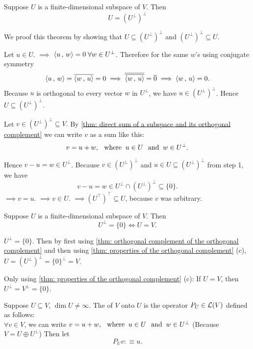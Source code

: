 \begin{thm}
  \label{thm: orthogonal complement of the orthogonal complement}
  Suppose $U$ is a finite-dimensional subspace of $V$. Then
  \[
    U = (U^{\bot})^{\bot}
  \]
\end{thm}
\begin{prf}
  We proof this theorem by showing that $U \subseteq (U^{\bot})^{\bot}$ and $ (U^{\bot})^{\bot} \subseteq U$.

   Let $u \in U$. $\implies$ $\left \langle u \, , \, w \right \rangle=0 \; \forall w \in U^{\bot}$.
  Therefore for the same $w$'s using conjugate symmetry
  \[
    \left \langle u \, , \, w \right \rangle=\overline{\left \langle w \, , \, u \right \rangle} =0 \implies
    \overline{\overline{\left \langle w \, , \, u \right \rangle}} =\overline{0} \implies
    \left \langle w \, , \, u \right \rangle = 0.
  \]
  Because $u$ is orthogonal to every vector
  $w$ in $U^{\bot}$, we have $u \in (U^{\bot})^{\bot}$. Hence $U \subseteq (U^{\bot})^{\bot}$.

   Let $v \in (U^{\bot})^{\bot} \subseteq V.$ By \ref{thm: direct sum of a subspace and its orthogonal complement} we can write $v$ as a sum like this:
  \[
    v = u + w, \;\;\, \text{where}\;\; u \in U \;\;\, \text{and}\;\; w \in U^{\bot}.
  \]

  Hence $v-u=w \in U^\bot$. Because
  $v \in (U^\bot)^\bot$ and $u \in U \subseteq (U^\bot)^\bot$ from step 1, we have
  \[
    v-u=w \in U^\bot \cap (U^\bot)^\bot \subseteq \{0\}.
  \]
  $\implies v=u.$ $\implies v \in U.$ $\implies (U^\top)^\top \subseteq U$, because $v$ was arbitrary.
\end{prf}

\begin{thm}
  Suppose $U$ is a finite-dimensional subspace of $V$. Then
  \begin{equation}
    U^\bot = \{0\} \iff U=V.
  \end{equation}
\end{thm}
\begin{prf}
   $U^\bot=\{0\}.$ Then by first using \ref{thm: orthogonal complement of the orthogonal complement} and then using \ref{thm: properties of the orthogonal complement} (c), $U = (U^\bot)^\bot = \{0\}^\bot = V$.

   Only using \ref{thm: properties of the orthogonal complement} (c): If $U=V$, then $U^\bot = V^\bot = \{0\}$.
\end{prf}

\begin{mydef}
  Suppose $U \subseteq V$, $\dim U \neq \infty$. The  of $V$ onto $U$ is the operator $P_U \in \mathcal{L}(V)$ defined as follows: \\
  $\forall v \in V$, we can write  $v = u + w, \;\;\, \text{where}\;\; u \in U \;\;\, \text{and}\;\; w \in U^\bot$ (Because $V=U \oplus U^\bot$) Then let
  \begin{equation}
    P_U v :\equiv u.
  \end{equation}
\end{mydef}

